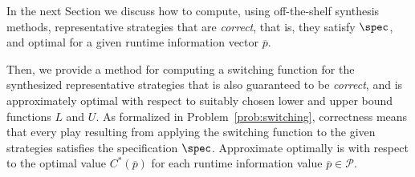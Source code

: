  In the next Section we discuss how to compute, using off-the-shelf synthesis methods, representative strategies that are \emph{correct}, that is, they satisfy $\spec$, and optimal for a given runtime information vector $\overline{p}$.

 Then, we provide a method for computing a switching function
 for the synthesized representative strategies that is also guaranteed to be \emph{correct}, and is approximately optimal with respect to suitably chosen lower and upper bound functions $L$ and $U$. As formalized in Problem~\ref{prob:switching}, correctness means that every play resulting from applying the switching function to the given strategies satisfies the specification $\spec$. Approximate optimally is with respect to the optimal value $C^\ast(\overline{p})$ for each runtime information value $\overline{p} \in \mathcal P$.



